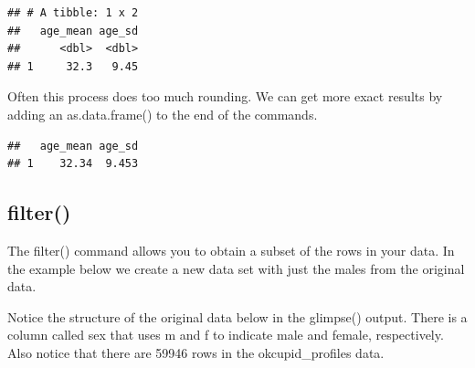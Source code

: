 \documentclass[
]{krantz}
\makeatletter
\newenvironment{Shaded}{\begin{snugshade}}{\end{snugshade}}
\newcommand{\DataTypeTok}[1]{\textcolor[rgb]{0.27,0.27,0.27}{#1}}
\newcommand{\KeywordTok}[1]{\textcolor[rgb]{0.27,0.27,0.27}{\textbf{#1}}}
\newcommand{\NormalTok}[1]{#1}
\newcommand{\OperatorTok}[1]{\textcolor[rgb]{0.43,0.43,0.43}{\textbf{#1}}}
\newcommand{\OtherTok}[1]{\textcolor[rgb]{0.37,0.37,0.37}{#1}}
\newcommand{\StringTok}[1]{\textcolor[rgb]{0.5,0.5,0.5}{#1}}
\newenvironment{kframe}{%
\medskip{}
\setlength{\fboxsep}{.8em}
 \def\at@end@of@kframe{}%
 \ifinner\ifhmode%
  \def\at@end@of@kframe{\end{minipage}}%
  \begin{minipage}{\columnwidth}%
 \fi\fi%
 \def\FrameCommand##1{\hskip\@totalleftmargin \hskip-\fboxsep
 \colorbox{shadecolor}{##1}\hskip-\fboxsep
     \hskip-\linewidth \hskip-\@totalleftmargin \hskip\columnwidth}%
 \MakeFramed {\advance\hsize-\width
   \@totalleftmargin\z@ \linewidth\hsize
   \@setminipage}}%
 {\par\unskip\endMakeFramed%
 \at@end@of@kframe}
\renewenvironment{Shaded}{\begin{kframe}}{\end{kframe}}
\makeatother
\begin{document}
\begin{Shaded}
\end{Shaded}

\begin{verbatim}
## # A tibble: 1 x 2
##   age_mean age_sd
##      <dbl>  <dbl>
## 1     32.3   9.45
\end{verbatim}

Often this process does too much rounding. We can get more exact results by adding an as.data.frame() to the end of the commands.

\begin{Shaded}
\end{Shaded}

\begin{verbatim}
##   age_mean age_sd
## 1    32.34  9.453
\end{verbatim}

\hypertarget{filter}{%
\subsection{filter()}\label{filter}}

The filter() command allows you to obtain a subset of the rows in your data. In the example below we create a new data set with just the males from the original data.

Notice the structure of the original data below in the glimpse() output. There is a column called sex that uses m and f to indicate male and female, respectively. Also notice that there are 59946 rows in the okcupid\_profiles data.
\end{document}
